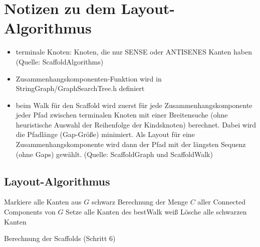 \documentclass[a4paper,10pt,parskip]{scrartcl}
\begin{document}
\section{Notizen zu dem Layout-Algorithmus}

\begin{itemize}
\item terminale Knoten: Knoten, die nur SENSE oder ANTISENES Kanten
  haben (Quelle: ScaffoldAlgorithms)
\item Zusammenhangskomponenten-Funktion wird in
  StringGraph/GraphSearchTree.h definiert
\item beim Walk für den Scaffold wird zuerst für jede
  Zusammenhangskomponente jeder Pfad zwischen terminalen Knoten mit
  einer Breitensuche (ohne heuristische Auswahl der Reihenfolge der
  Kindsknoten) berechnet. Dabei wird die Pfadlänge (Gap-Größe)
  minimiert. Als Layout für eine Zusammenhangskomponente wird dann
  der Pfad mit der längsten Sequenz (ohne Gaps) gewählt. (Quelle:
  ScaffoldGraph und ScaffoldWalk)
\end{itemize}

\subsection{Layout-Algorithmus}

\begin{algorithm}[H]
  \SetAlgoLined
  Markiere alle Kanten aus $G$ schwarz\;
  Berechnung der Menge $C$ aller Connected Components von $G$\;
  Setze alle Kanten des bestWalk weiß\;
  Lösche alle schwarzen Kanten\;
  \caption{Berechnung der Scaffolds (Schritt 6)}
\end{algorithm}
\end{document}

